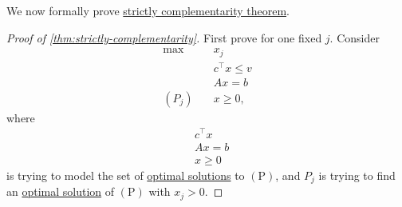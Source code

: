 We now formally prove \hyperref[thm:strictly-complementarity]{strictly complementarity theorem}.

\begin{proof}[Proof of \autoref{thm:strictly-complementarity}]
	First prove for one fixed \(j\). Consider
	\[
		\begin{aligned}
			\max~        & x_{j}            \\
			             & c^{\top}x \leq v \\
			             & Ax = b           \\
			(P_{j})\quad & x\geq 0,
		\end{aligned}
	\]
	where
	\[
		\begin{aligned}
			 & c^{\top}x \\
			 & Ax = b    \\
			 & x\geq 0
		\end{aligned}
	\]
	is trying to model the set of \hyperref[def:optimal-solution]{optimal solutions} to \((\mathrm{P})\), and \(P_{j}\) is trying to find an \hyperref[def:optimal-solution]{optimal solution} of \((\mathrm{P})\) with \(x_{j}>0\).


\end{proof}
